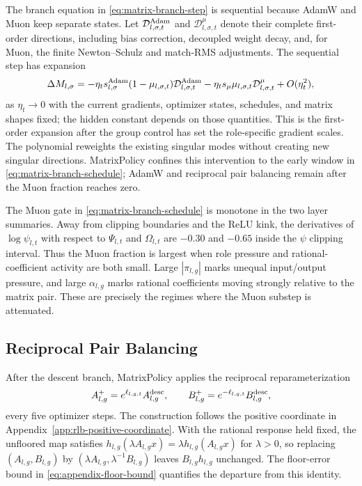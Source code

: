 \documentclass{article}
\begin{document}
The branch equation in \eqref{eq:matrix-branch-step} is sequential because AdamW
and Muon keep separate states.  Let
$\mathcal D^{\rm Adam}_{l,\sigma,t}$ and
$\mathcal D^{\mu}_{l,\sigma,t}$ denote their complete first-order directions,
including bias correction, decoupled weight decay, and, for Muon, the finite
Newton--Schulz and match-RMS adjustments.  The sequential step has expansion
\begin{equation}
    \Delta M_{l,\sigma}
    =
    -\eta_t s^{\rm Adam}_{l,\sigma}(1-\mu_{l,\sigma,t})
    \mathcal D^{\rm Adam}_{l,\sigma,t}
    -\eta_t s_\mu\mu_{l,\sigma,t}
    \mathcal D^\mu_{l,\sigma,t}
    +O(\eta_t^2),
    \label{eq:appendix-branch-first-order}
\end{equation}
as $\eta_t\to0$ with the current gradients, optimizer states, schedules, and
matrix shapes fixed; the hidden constant depends on those quantities.  This is
the first-order expansion after the group control has set the role-specific
gradient scales.  The polynomial reweights the existing singular modes without
creating new singular directions.
MatrixPolicy confines this intervention
to the early window in \eqref{eq:matrix-branch-schedule}; AdamW and reciprocal
pair balancing remain after the Muon fraction reaches zero.

The Muon gate in \eqref{eq:matrix-branch-schedule} is monotone in the two layer
summaries.  Away from clipping boundaries and the ReLU kink, the derivatives of
$\log\psi_{l,t}$ with respect to $\Psi_{l,t}$ and $\Omega_{l,t}$ are $-0.30$
and $-0.65$ inside the $\psi$ clipping interval.  Thus the Muon fraction is
largest when role pressure and rational-coefficient activity are both small.
Large $|\pi_{l,g}|$ marks
unequal input/output pressure, and large $\alpha_{l,g}$ marks rational
coefficients moving strongly relative to the matrix pair.  These are precisely
the regimes where the Muon substep is attenuated.

\subsection{Reciprocal Pair Balancing}
\label{app:matrixpolicy-pair-rescale}

After the descent branch, MatrixPolicy applies the reciprocal
reparameterization
\begin{equation}
    A_{l,g}^{+}=e^{\ell_{l,g,t}}A^{\rm desc}_{l,g},
    \qquad
    B_{l,g}^{+}=e^{-\ell_{l,g,t}}B^{\rm desc}_{l,g},
    \label{eq:appendix-reciprocal-move}
\end{equation}
every five optimizer steps.  The construction follows the positive coordinate in
Appendix~\ref{app:rlb-positive-coordinate}.  With the rational response held
fixed, the unfloored map satisfies
$h_{l,g}(\lambda A_{l,g}x)=\lambda h_{l,g}(A_{l,g}x)$ for $\lambda>0$, so
replacing $(A_{l,g},B_{l,g})$ by
$(\lambda A_{l,g},\lambda^{-1}B_{l,g})$ leaves $B_{l,g}h_{l,g}$ unchanged.
The floor-error bound in \eqref{eq:appendix-floor-bound} quantifies the
departure from this identity.
\end{document}
